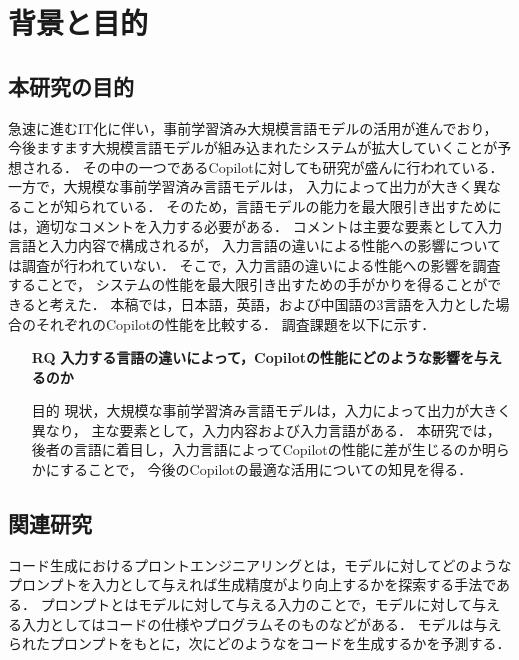 \section{背景と目的\label{related_research}}

\subsection{本研究の目的}
  急速に進むIT化に伴い，事前学習済み大規模言語モデルの活用が進んでおり，
  今後ますます大規模言語モデルが組み込まれたシステムが拡大していくことが予想される．
  その中の一つであるCopilotに対しても研究が盛んに行われている\cite{Yao2022ACL}\cite{Nguyen2022MSR}\cite{Sobania2022GECCO}\cite{Dakhel2022arXiv}\cite{Vaithilingam2022CHI}．
  一方で，大規模な事前学習済み言語モデルは，
  入力によって出力が大きく異なることが知られている\cite{Yao2022ACL}．
  そのため，言語モデルの能力を最大限引き出すためには，適切なコメントを入力する必要がある．
  コメントは主要な要素として入力言語と入力内容で構成されるが，
  入力言語の違いによる性能への影響については調査が行われていない．
  そこで，入力言語の違いによる性能への影響を調査することで，
  システムの性能を最大限引き出すための手がかりを得ることができると考えた．
  本稿では，日本語，英語，および中国語の3言語を入力とした場合のそれぞれのCopilotの性能を比較する．
  調査課題を以下に示す．

  
  \begin{itemize}
    \item[\textbf{RQ}] \textbf{入力する言語の違いによって，Copilotの性能にどのような影響を与えるのか}
      \item[目的]{%
      現状，大規模な事前学習済み言語モデルは，入力によって出力が大きく異なり，
      主な要素として，入力内容および入力言語がある．
      本研究では，後者の言語に着目し，入力言語によってCopilotの性能に差が生じるのか明らかにすることで，
      今後のCopilotの最適な活用についての知見を得る．}
  \end{itemize}

\subsection{関連研究}
  コード生成におけるプロントエンジニアリングとは，モデルに対してどのようなプロンプトを入力として与えれば生成精度がより向上するかを探索する手法である．
  プロンプトとはモデルに対して与える入力のことで，モデルに対して与える入力としてはコードの仕様やプログラムそのものなどがある．
  モデルは与えられたプロンプトをもとに，次にどのようなをコードを生成するかを予測する．
  
